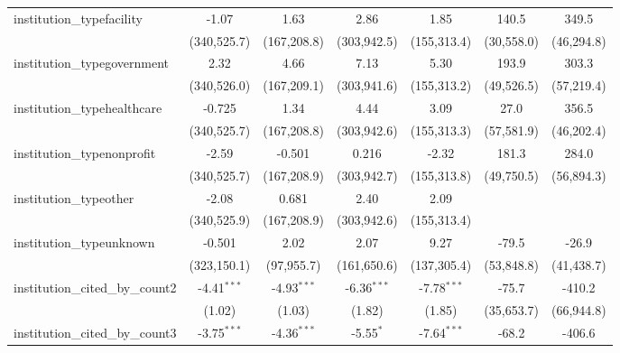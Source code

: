 \begin{tabular}{lcccccc}
   institution\_typefacility             & -1.07         & 1.63          & 2.86          & 1.85          & 140.5        & 349.5\\   
                                         & (340,525.7)   & (167,208.8)   & (303,942.5)   & (155,313.4)   & (30,558.0)   & (46,294.8)\\   
   institution\_typegovernment           & 2.32          & 4.66          & 7.13          & 5.30          & 193.9        & 303.3\\   
                                         & (340,526.0)   & (167,209.1)   & (303,941.6)   & (155,313.2)   & (49,526.5)   & (57,219.4)\\   
   institution\_typehealthcare           & -0.725        & 1.34          & 4.44          & 3.09          & 27.0         & 356.5\\   
                                         & (340,525.7)   & (167,208.8)   & (303,942.6)   & (155,313.3)   & (57,581.9)   & (46,202.4)\\   
   institution\_typenonprofit            & -2.59         & -0.501        & 0.216         & -2.32         & 181.3        & 284.0\\   
                                         & (340,525.7)   & (167,208.9)   & (303,942.7)   & (155,313.8)   & (49,750.5)   & (56,894.3)\\   
   institution\_typeother                & -2.08         & 0.681         & 2.40          & 2.09          &              &   \\   
                                         & (340,525.9)   & (167,208.9)   & (303,942.6)   & (155,313.4)   &              &   \\   
   institution\_typeunknown              & -0.501        & 2.02          & 2.07          & 9.27          & -79.5        & -26.9\\   
                                         & (323,150.1)   & (97,955.7)    & (161,650.6)   & (137,305.4)   & (53,848.8)   & (41,438.7)\\   
   institution\_cited\_by\_count2        & -4.41$^{***}$ & -4.93$^{***}$ & -6.36$^{***}$ & -7.78$^{***}$ & -75.7        & -410.2\\   
                                         & (1.02)        & (1.03)        & (1.82)        & (1.85)        & (35,653.7)   & (66,944.8)\\   
   institution\_cited\_by\_count3        & -3.75$^{***}$ & -4.36$^{***}$ & -5.55$^{*}$   & -7.64$^{***}$ & -68.2        & -406.6\\   

\end{tabular}
